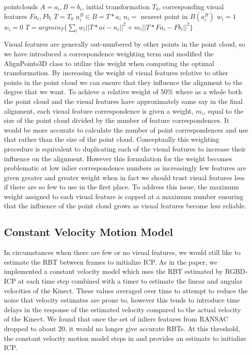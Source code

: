 \documentclass[letterpaper, 10pt, conference]{ieeeconf}
\begin{document}
\begin{algorithm}
\begin{algorithmic}
\REQUIRE pointclouds $A = a_{i}, B = b_{i}$, initial transformation $T_{0}$, corresponding visual features $Fa_{i}, Fb_{i}$
\STATE $T = T_{0}$
\STATE $a^{B}_{i} \in B = T * a_i$
\STATE $n_{i} = $ nearest point in $B(a^{B}_{i})$
    \STATE $w_i = 1$
\ELSE
    \STATE $w_i = 0$
\ENDIF
\ENDFOR
\STATE $T = argmin_{T} \{\sum_{i} w_{i}||T*a{i} - n_{i} ||^2 + m_{i} ||T*Fa_{i} - Fb_{i}||^2\} $
\ENDWHILE
\end{algorithmic}
\end{algorithm}

	Visual features are generally out-numbered by other points in the point cloud, so we have introduced a correspondence weighting term and modified the AlignPoints3D class to utilize this weight when computing the optimal transformation.  By increasing the weight of visual features relative to other points in the point cloud we can ensure that they influence the alignment to the degree that we want.  To achieve a relative weight of 50\% where as a whole both the point cloud and the visual features have approximately same say in the final alignment, each visual feature correspondence is given a weight, $m_{i}$, equal to the size of the point cloud divided by the number of feature correspondences.  It would be more accurate to calculate the number of point correspondences and use that rather than the size of the point cloud.  Conceptually this weighting procedure is equivalent to duplicating each of the visual features to increase their influence on the alignment.  However this formulation for the weight becomes problematic at low inlier correspondence numbers as increasingly few features are given greater and greater weight when in fact we should trust visual features less if there are so few to use in the first place.  To address this issue, the maximum weight assigned to each visual feature is capped at a maximum number ensuring that the influence of the point cloud grows as visual features become less reliable.

\subsection{Constant Velocity Motion Model}
In circumstances when there are few or no visual features, we would still like to estimate the RBT between frames to initialize ICP.  As in the paper, we implemented a constant velocity model which uses the RBT estimated by RGBD-ICP at each time step combined with a timer to estimate the linear and angular velocities of the Kinect.  These values averaged over time to attempt to reduce the noise that velocity estimates are prone to, however this tends to introduce time delays in the response of the estimated velocity compared to the actual velocity of the Kinect.  We found that once the set of inliers features from RANSAC dropped to about 20, it would no longer give accurate RBTs.  At this threshold, the constant velocity motion model steps in and provides an estimate to initialize ICP.
\end{document}
